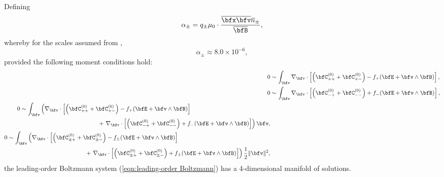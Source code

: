     \begin{lemma}
        Defining
        \begin{equation}
            \alpha_{\pm}  =  q_{\pm}\mu_{0}\cdot\frac{\overline{\bfx}\overline{\bfv}\overline{n}_{\pm}}{\overline{\bfB}},
        \end{equation}
        whereby for the scales assumed from \cite{Wes00},
        \begin{equation}
            \alpha_{\pm}  \approx  8.0\times 10^{- 6},
        \end{equation}
        provided the following moment conditions hold:
        \begin{align}
            0  &\sim  \int_{\bfv}\nabla_{\bfv}\cdot\left[\left(\bfC_{++}^{(0)} + \bfC_{+-}^{(0)}\right) - f_{+}(\bfE + \bfv\wedge\bfB)\right],  \label{eqn:leading-order + conservation}  \\
            0  &\sim  \int_{\bfv}\nabla_{\bfv}\cdot\left[\left(\bfC_{-+}^{(0)} + \bfC_{--}^{(0)}\right) + f_{-}(\bfE + \bfv\wedge\bfB)\right],  \label{eqn:leading-order - conservation}  \\
            \begin{split}
                0  &\sim  \int_{\bfv}\left(\nabla_{\bfv}\cdot\left[\left(\bfC_{++}^{(0)} + \bfC_{+-}^{(0)}\right) - f_{+}(\bfE + \bfv\wedge\bfB)\right]\right.  \\
                &\;\;\;\;\;\;\;\;\;\;\;\;\;\;\;\;\;\;\;\;\;\;\;\;\;\;\;\;\;\;\;\;\;\;\;\;\;\;\;\;\;\;\;\;\;\;\;\;+ \left.\nabla_{\bfv}\cdot\left[\left(\bfC_{-+}^{(0)} + \bfC_{--}^{(0)}\right) + f_{-}(\bfE + \bfv\wedge\bfB)\right]\right)\bfv,
            \end{split}  \label{eqn:leading-order momentum conservation}  \\
            \begin{split}
                0  &\sim  \int_{\bfv}\left(\nabla_{\bfv}\cdot\left[\left(\bfC_{\pm+}^{(0)} + \bfC_{\pm-}^{(0)}\right) - f_{\pm}(\bfE + \bfv\wedge\bfB)\right]\right.  \\
                &\;\;\;\;\;\;\;\;\;\;\;\;\;\;\;\;\;\;\;\;\;\;\;\;\;\;\;\;\;\;\;\;\;\;\;\;\;\;\;\;\;\;\;\;\;\;\;\;+ \left.\nabla_{\bfv}\cdot\left[\left(\bfC_{\pm+}^{(0)} + \bfC_{\pm-}^{(0)}\right) + f_{\pm}(\bfE + \bfv\wedge\bfB)\right]\right)\frac{1}{2}\|\bfv\|^{2},
            \end{split}  \label{eqn:leading-order energy conservation}
        \end{align}
        the leading-order Boltzmann system (\ref{eqn:leading-order Boltzmann}) has a 4-dimensional manifold of solutions. 
    \end{lemma}

